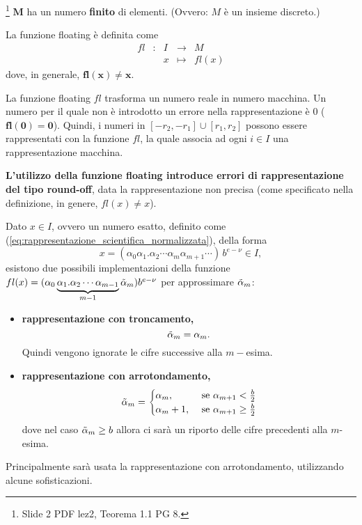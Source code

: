\begin{theorem}\footnote{Slide 2 PDF lez2, Teorema 1.1 PG 8.}
	$\boldsymbol M$ ha un numero \textbf{finito} di elementi. (Ovvero: $M$ è un insieme discreto.)
\end{theorem}

\begin{definition}
	La funzione floating è definita come
	\begin{equation*}
		\begin{matrix}
			fl&:&I&\rightarrow& M\\
			&&x&\mapsto& fl(x)
		\end{matrix}
	\end{equation*}
	dove, in generale, $\boldsymbol{fl(x)\neq x}$. 
\end{definition}

La funzione floating $fl$ trasforma un numero reale in numero macchina. Un numero per il quale non è introdotto un errore nella rappresentazione è 0 ($\boldsymbol{fl(0)=0}$). Quindi, i numeri in $[-r_2,-r_1]\cup [r_1,r_2]$ possono essere rappresentati con la funzione $fl$, la quale associa ad ogni $i\in I$ una rappresentazione macchina. 

\textbf{L'utilizzo della funzione floating introduce errori di rappresentazione del tipo round-off}, data la rappresentazione non precisa (come specificato nella definizione, in genere, $fl(x)\neq x$).

\begin{definition}
	Dato $x\in I$, ovvero un numero esatto, definito come (\ref{eq:rappresentazione_scientifica_normalizzata}), della forma 
	\begin{equation}\label{eq:numEsatto}
		x=(\alpha_0\alpha_1.\alpha_2\cdots\alpha_m\alpha_{m+1}\cdots)\,b^{e-\nu}\in I,
	\end{equation}
	esistono due possibili implementazioni della funzione $fl(x)=(\alpha_0\underbrace{\alpha_1.\alpha_2\cdots\alpha_{m-1}}_{m-1}\Tilde{\alpha}_m)b^{e-\nu}$ per approssimare $\Tilde{\alpha}_m$:
	\begin{itemize}
		\item \textbf{rappresentazione con troncamento,} \begin{equation}\label{eq:troncamento}
			\Tilde{\alpha}_m=\alpha_m.
		\end{equation}
		Quindi vengono ignorate le cifre successive alla $m-$esima.
		\item \textbf{rappresentazione con arrotondamento,}
		\begin{align}
			\Tilde{\alpha}_m=
			\begin{cases}
				\alpha_m, &\text{ se }\alpha_{m+1}<\frac{b}{2}\\
				\alpha_m+1, &\text{ se }\alpha_{m+1}\geq\frac{b}{2}
			\end{cases}
		\end{align}
		dove nel caso $\Tilde{\alpha}_m\geq b$ allora ci sarà un riporto delle cifre precedenti alla $m$-esima.
	\end{itemize}
\end{definition}
Principalmente sarà usata la rappresentazione con arrotondamento, utilizzando alcune sofisticazioni.

